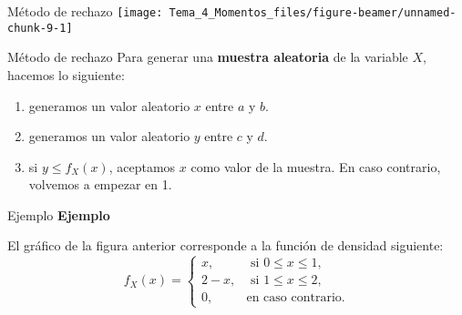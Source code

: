 \documentclass[
  ignorenonframetext,
  aspectratio=169]{beamer}
\begin{document}
\begin{frame}{Método de rechazo}
\protect\hypertarget{muxe9todo-de-rechazo-1}{}
\texttt{[image: Tema\_4\_Momentos\_files/figure-beamer/unnamed-chunk-9-1]}
\end{frame}

\begin{frame}{Método de rechazo}
\protect\hypertarget{muxe9todo-de-rechazo-2}{}
Para generar una \textbf{muestra aleatoria} de la variable \(X\),
hacemos lo siguiente:

\begin{enumerate}
[1)]
\item
  generamos un valor aleatorio \(x\) entre \(a\) y \(b\).
\item
  generamos un valor aleatorio \(y\) entre \(c\) y \(d\).
\item
  si \(y\leq f_X(x)\), aceptamos \(x\) como valor de la muestra. En caso
  contrario, volvemos a empezar en 1.
\end{enumerate}
\end{frame}

\begin{frame}{Ejemplo}
\protect\hypertarget{ejemplo-8}{}
\textbf{Ejemplo}

El gráfico de la figura anterior corresponde a la función de densidad
siguiente: \[
f_X(x)=\begin{cases}
x, & \mbox{ si }0\leq x\leq 1,\\
2-x, & \mbox{ si }1\leq x\leq 2,\\
0, & \mbox{en caso contrario.}
\end{cases}
\]
\end{frame}
\end{document}
